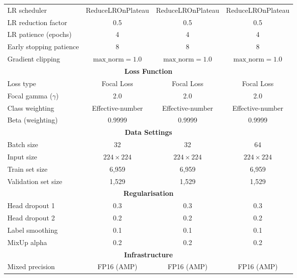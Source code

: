 \begin{spacing}{1.3}
\begin{table}[H]
\begin{tabular}{lccc}
LR scheduler              & ReduceLROnPlateau  & ReduceLROnPlateau  & ReduceLROnPlateau  \\
LR reduction factor       & 0.5                & 0.5                & 0.5                \\
LR patience (epochs)      & 4                  & 4                  & 4                  \\
Early stopping patience   & 8                  & 8                  & 8                  \\
Gradient clipping         & $\text{max\_norm}=1.0$ & $\text{max\_norm}=1.0$ & $\text{max\_norm}=1.0$ \\
\midrule
\multicolumn{4}{c}{\textbf{Loss Function}} \\
\midrule
Loss type             & Focal Loss       & Focal Loss        & Focal Loss         \\
Focal gamma ($\gamma$)  & 2.0              & 2.0               & 2.0                \\
Class weighting       & Effective-number & Effective-number  & Effective-number   \\
Beta (weighting)      & 0.9999           & 0.9999            & 0.9999             \\
\midrule
\multicolumn{4}{c}{\textbf{Data Settings}} \\
\midrule
Batch size            & 32               & 32                & 64                 \\
Input size            & $224 \times 224$ & $224 \times 224$  & $224 \times 224$   \\
Train set size        & 6,959            & 6,959             & 6,959              \\
Validation set size   & 1,529            & 1,529             & 1,529              \\
\midrule
\multicolumn{4}{c}{\textbf{Regularisation}} \\
\midrule
Head dropout 1        & 0.3              & 0.3               & 0.3                \\
Head dropout 2        & 0.2              & 0.2               & 0.2                \\
Label smoothing       & 0.1              & 0.1               & 0.1                \\
MixUp alpha           & 0.2              & 0.2               & 0.2                \\
\midrule
\multicolumn{4}{c}{\textbf{Infrastructure}} \\
\midrule
Mixed precision       & FP16 (AMP)       & FP16 (AMP)        & FP16 (AMP)         \\

\end{tabular}
\end{table}
\end{spacing}
